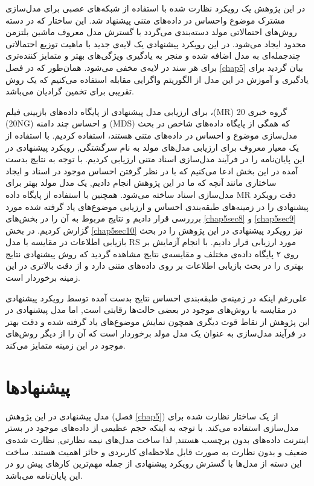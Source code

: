 در این پژوهش یک رویکرد نظارت شده با استفاده از شبکه‌های عصبی برای مدل‌سازی مشترک موضوع واحساس در داده‌های متنی پیشنهاد شد. این ساختار که در دسته روش‌های احتمالاتی مولد دسته‌بندی می‌گردد با گسترش مدل معروف ماشین بلتزمن محدود ایجاد می‌شود. در این رویکرد پیشنهادی یک لایه‌ی جدید با ماهیت توزیع احتمالاتی چندجمله‌ای به مدل اضافه شده و منجر به یادگیری ویژگی‌های بهتر و متمایز کننده‌تری برای هر سند در لایه‌ی مخفی
می‌شود. همان‌طور که در فصل 
\ref{chap5}
بیان گردید برای یادگیری و آموزش در این مدل از الگوریتم واگرایی مقابله استفاده می‌کنیم که یک روش تقریبی برای تخمین گرادیان می‌باشد.

برای ارزیابی مدل پیشنهادی از پایگاه داده‌های بازبینی فیلم
،(MR)
 20 گروه خبری 
(20NG)
 و احساس چند دامنه 
(MDS)
 که همگی از پایگاه داده‌های شاخص در بحث مدل‌سازی موضوع و احساس  در داده‌های متنی هستند، استفاده کردیم. با استفاده از یک معيار معروف برای ارزیابی مدل‌های مولد به نام سرگشتگی, رویکرد پیشنهادی در این پایان‌‌نامه را در فرآیند مدل‌سازی اسناد متنی ارزیابی کردیم. با توجه به نتایج بدست آمده در این بخش ادعا می‌کنیم که با در نظر گرفتن احساس موجود در اسناد و ایجاد ساختاری مانند آنچه که ما در این پژوهش انجام دادیم, یک مدل مولد بهتر برای مدل‌سازی اسناد ساخته می‌شود. همچنین با استفاده از پایگاه داده 
MR
 دقت رویکرد پیشنهادی را در زمینه‌های طبقه‌بندی احساس و ارزیابی موضوع‌های یاد گرفته شده مورد برررسی قرار دادیم و نتایج مربوط به آن را در بخش‌های
\ref{chap5sec8}
و
\ref{chap5sec9}
گزارش کردیم. در بخش
\ref{chap5sec10}
نیز رویکرد پیشنهادی در این پژوهش را در بحث بازیابی اطلاعات در مقایسه با مدل
RS
مورد ارزیابی قرار دادیم. با انجام آزمایش بر روی ۲ پایگاه داده‌‌ی مختلف و مقایسه‌ی نتایج مشاهده گردید که روش پیشنهادی نتایج بهتری را در بحث بازیابی اطلاعات بر روی داده‌های متنی دارد و از دقت بالاتری در این زمینه برخوردار است.

علی‌رغم اینکه در زمینه‌ی طبقه‌بندی احساس نتایج بدست آمده توسط رویکرد پیشنهادی در مقایسه با روش‌های موجود در بعضی حالت‌ها رقابتی است, اما مدل پیشنهادی در این پژوهش از نقاط قوت دیگری همچون نمایش موضوع‌های یاد گرفته شده و دقت بهتر در فرآیند مدل‌سازی به عنوان یک مدل مولد برخوردار است که آن را از دیگر روش‌های موجود در این زمینه متمایز می‌کند.


\section{پیشنهاد‌ها}
مدل پیشنهادی در این پژوهش
(فصل 
\ref{chap5})
از یک ساختار نظارت شده برای مدل‌سازی استفاده می‌کند. با توجه به اینکه حجم عظیمی از داده‌های موجود در بستر اینترنت داده‌های بدون برچسب هستند, لذا ساخت مدل‌های نیمه نظارتی, نظارت شده‌ی ضعیف و بدون نظارت به صورت قابل ملاحظه‌ای کاربردی و حائز اهمیت هستند. ساخت این دسته از مدل‌ها با گسترش رویکرد پیشنهادی از جمله مهم‌ترین کارهای پیش‌ رو در این پایان‌نامه می‌باشد. 

